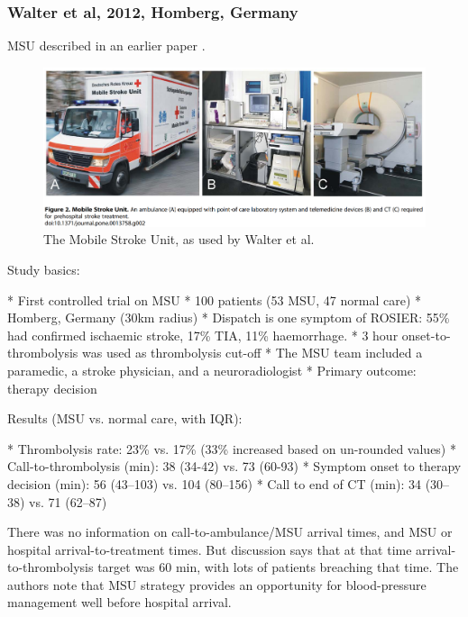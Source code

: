 \subsubsection{Walter et al, 2012, Homberg, Germany \cite{walter_diagnosis_2012}}

MSU described in an earlier paper \cite{walter_bringing_2010}.

\begin{figure}[ht]
    \centering
    \includegraphics[width=0.95\linewidth]{images_background/walter_msu}
    \caption{The Mobile Stroke Unit, as used by Walter et al.}
    \label{fig:walter_msu}
\end{figure}

Study basics:

\begin{markdown}
* First controlled trial on MSU
* 100 patients (53 MSU, 47 normal care)
* Homberg, Germany (30km radius)
* Dispatch is one symptom of ROSIER: 55\% had confirmed ischaemic stroke, 17\% TIA, 11\% haemorrhage.
* 3 hour onset-to-thrombolysis was used as thrombolysis cut-off
* The MSU team included a paramedic, a stroke physician, and a neuroradiologist
* Primary outcome: therapy decision
\end{markdown}

Results (MSU vs. normal care, with IQR):

\begin{markdown}
* Thrombolysis rate: 23\% vs. 17\% (33\% increased based on un-rounded values)
* Call-to-thrombolysis (min): 38 (34-42) vs. 73 (60-93)
* Symptom onset to therapy decision (min): 56 (43–103) vs. 104 (80–156)
* Call to end of CT (min): 34 (30–38) vs. 71 (62–87)
\end{markdown}

There was no information on call-to-ambulance/MSU arrival times, and MSU or hospital arrival-to-treatment times. But discussion says that at that time arrival-to-thrombolysis target was 60 min, with lots of patients breaching that time. The authors note that MSU strategy provides an opportunity for  blood-pressure management well before hospital arrival.

